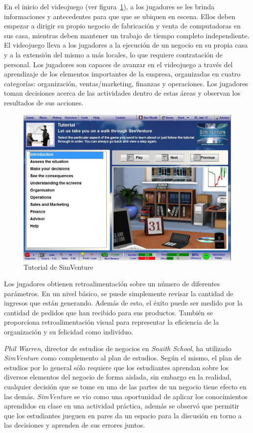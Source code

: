 En el inicio del videojuego (ver figura~\ref{fig:simventure_tutorial}), a los jugadores se
les brinda informaciones y antecedentes para que que se ubiquen en escena. Ellos
deben empezar a dirigir su propio negocio de fabricación y venta de
computadoras en sus casa, mientras deben mantener un trabajo de tiempo completo
independiente. El videojuego lleva a los jugadores a la ejecución de un negocio en su
propia casa y a la extensión del mismo a más locales, lo que requiere
contratación de personal. Los jugadores son capaces de avanzar en el videojuego a
través del aprendizaje de los elementos importantes de la empresa, organizadas
en cuatro categorías: organización, ventas/marketing, finanzas y operaciones.
Los jugadores toman decisiones acerca de las actividades dentro de estas áreas y
observan los resultados de sus acciones.

\begin{figure}[ht!]
\centering
\includegraphics[scale=0.3]{tics/images/simventure-tutorial.jpg}
\caption{Tutorial de SimVenture}
\label{fig:simventure_tutorial}
\end{figure}

Los jugadores obtienen retroalimentación sobre un número de diferentes
parámetros. En un nivel básico, se puede simplemente revisar la cantidad de
ingresos que están generando. Además de esto, el éxito puede ser medido por la
cantidad de pedidos que han recibido para sus productos. También se proporciona
retroalimentación visual para representar la eficiencia de la organización y su
felicidad como individuo.

\emph{Phil Warren}, director de estudios de negocios en \emph{Snaith School}, ha
utilizado \emph{SimVenture} como complemento al plan de estudios. Según el
mismo, el plan de estudios por lo general sólo requiere que los estudiantes
aprendan sobre los diversos elementos del negocio de forma aislada, sin embargo
en la realidad, cualquier decisión que se tome en una de las partes de un
negocio tiene efecto en las demás. \emph{SimVenture} se vio como una oportunidad
de aplicar los conocimientos aprendidos en clase en una actividad práctica,
además se observó que permitir que los estudiantes jueguen en pares da un
espacio para la discusión en torno a las decisiones y aprenden de sus errores
juntos\cite{education:games}.

